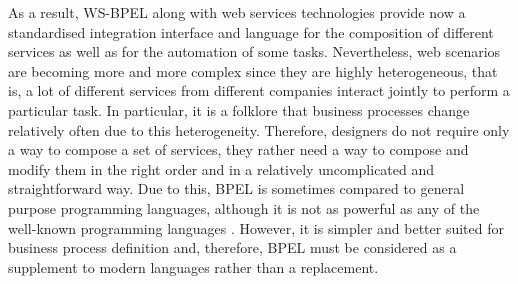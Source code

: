 As a result, WS-BPEL along with web services technologies provide now a standardised integration interface 
and language for the composition of different services as well as for the automation of some tasks. 
Nevertheless, web scenarios are becoming more and more complex since they are highly heterogeneous, that is, a lot of different
services from different companies interact jointly to perform a particular task. In particular, it is a folklore 
that business processes change relatively often due to this heterogeneity. Therefore, designers 
do not require only a way to compose a set of services, they rather
need a way to compose and modify them in the right order and in a relatively 
uncomplicated and straightforward way. Due to this, BPEL is sometimes compared 
to general purpose programming languages, although it
is not as powerful as any of the well-known programming languages \cite{bpelsoftcare}. However, 
it is simpler and better suited for business
process definition and, therefore, BPEL must be considered as a supplement to
modern languages rather than a replacement.




